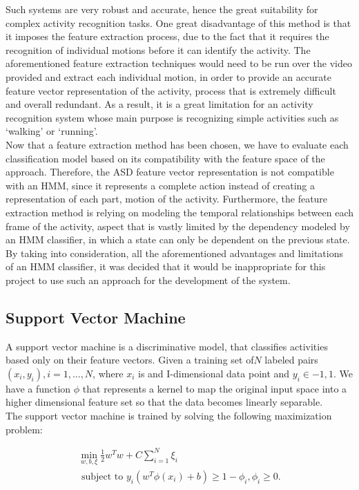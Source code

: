 \documentclass[11pt]{report}
\begin{document}
Such systems are very robust and accurate, hence the great suitability for complex activity recognition tasks. One great disadvantage of this method is that it imposes the feature extraction process, due to the fact that it requires the recognition of individual motions before it can identify the activity. The aforementioned feature extraction techniques would need to be run over the video provided and extract each individual motion, in order to provide an accurate feature vector representation of the activity, process that is extremely difficult and overall redundant. As a result, it is a great limitation for an activity recognition system whose main purpose is recognizing simple activities such as `walking' or `running'. \\
Now that a feature extraction method has been chosen, we have to evaluate each classification model based on its compatibility with the feature space of the approach. Therefore, the ASD feature vector representation is not compatible with an HMM, since it represents a complete action instead of creating a representation of each part, motion of the activity. Furthermore, the feature extraction method is relying on modeling the temporal relationships between each frame of the activity, aspect that is vastly limited by the dependency modeled by an HMM classifier, in which a state can only be dependent on the previous state. \\
By taking into consideration, all the aforementioned advantages and limitations of an HMM classifier, it was decided that it would be inappropriate for this project to use such an approach for the development of the system.  \\

\subsection{Support Vector Machine}
A support vector machine is a discriminative model, that classifies activities based only on their feature vectors. Given a training set of\(N\) labeled pairs \((x_i,y_i), i = 1,...,N\), where \(x_i\) is and I-dimensional data point and \(y_i \in {-1, 1}\). We have a function \(\phi\) that represents a kernel to map the original input space into a higher dimensional feature set so that the data becomes linearly separable. \\
The support vector machine is trained by solving the following maximization problem:

\begin{equation}
\begin{multlined}
\min_{w,b,\xi} \frac{1}{2}w^Tw + C \sum_{i=1}^N \xi_i \\
\text{ subject to } y_i(w^T \phi(x_i) + b) \geq 1- \phi_i, \phi_i \geq 0. 
\end{multlined}
\end{equation}
\end{document}
